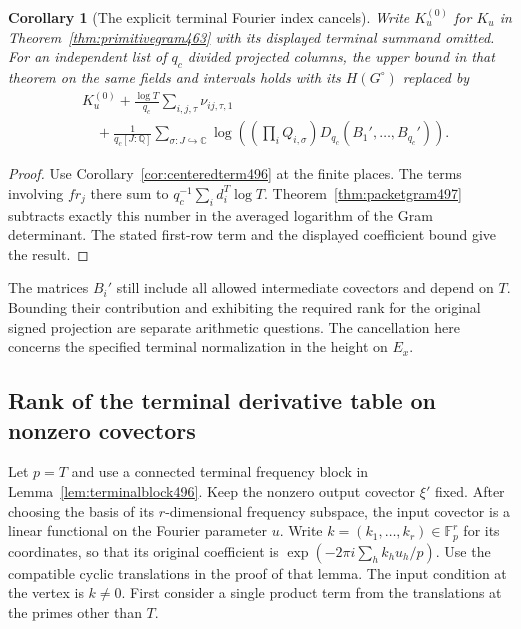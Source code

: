 \documentclass[a4paper,11pt]{article}
\newtheorem{corollary}[proposition]{Corollary}
\theoremstyle{definition}
\theoremstyle{remark}
\numberwithin{equation}{section}
\begin{document}
\begin{corollary}[The explicit terminal Fourier index cancels]\leavevmode
\label{cor:terminalheight497}
Write \(K_u^{(0)}\) for \(K_u\) in Theorem~\ref{thm:primitivegram463}
with its displayed terminal summand omitted. For an independent
list of \(q_c\) divided projected columns, the upper bound in
that theorem on the same fields and intervals holds with its
\(H(G^\circ)\) replaced by
\[
 \begin{aligned}
 &K_u^{(0)}
     +\frac{\log T}{q_c}\sum_{i,j,\tau}\nu_{ij,\tau,1}\\
 &\quad+\frac{1}{q_c[J:\mathbb Q]}
   \sum_{\sigma:J\hookrightarrow\mathbb C}
     \log\left(\left(\prod_i Q_{i,\sigma}\right)
                         D_{q_c}(B_1',\ldots,B_{q_c}')\right).
 \end{aligned}
\]
\end{corollary}
\begin{proof}
Use Corollary~\ref{cor:centeredterm496} at the finite places.
The terms involving \(fr_j\) there sum to
\(q_c^{-1}\sum_i d_i^T\log T\). Theorem~\ref{thm:packetgram497}
subtracts exactly this number in the averaged logarithm of
the Gram determinant. The stated first-row term and the
displayed coefficient bound give the result.
\end{proof}
The matrices \(B_i'\) still include all allowed intermediate
covectors and depend on \(T\). Bounding their contribution and
exhibiting the required rank for the original signed projection
are separate arithmetic questions. The cancellation here concerns
the specified terminal normalization in the height on \(E_x\).


\subsection{Rank of the terminal derivative table on nonzero covectors}
\label{sec:puncturedrank498}

Let \(p=T\) and use a connected terminal frequency block in
Lemma~\ref{lem:terminalblock496}. Keep the nonzero output
covector \(\xi'\) fixed. After choosing the basis of its
\(r\)-dimensional frequency subspace, the input covector is a
linear functional on the Fourier parameter \(u\). Write
\(k=(k_1,\ldots,k_r)\in\mathbb F_p^r\) for its coordinates, so
that its original coefficient is
\(\exp(-2\pi i\sum_h k_hu_h/p)\). Use the compatible cyclic
translations in the proof of that lemma. The input condition at
the vertex is \(k\ne0\). First consider a single product term
from the translations at the primes other than \(T\).
\end{document}
